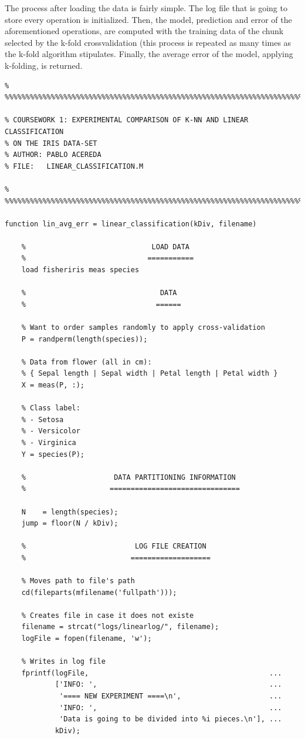 \documentclass[11pt]{article}
\begin{document}
The process after loading the data is fairly simple. The log file that is going
to store every operation is initialized. Then, the model, prediction and error
of the aforementioned operations, are computed with the training data of the
chunk selected by the k-fold crossvalidation (this process is repeated as many
times as the k-fold algorithm stipulates. Finally, the average error of the
model, applying k-folding, is returned.

\begin{verbatim}
% %%%%%%%%%%%%%%%%%%%%%%%%%%%%%%%%%%%%%%%%%%%%%%%%%%%%%%%%%%%%%%%%%%%%%%%%%

% COURSEWORK 1: EXPERIMENTAL COMPARISON OF K-NN AND LINEAR CLASSIFICATION
% ON THE IRIS DATA-SET
% AUTHOR: PABLO ACEREDA
% FILE:   LINEAR_CLASSIFICATION.M

% %%%%%%%%%%%%%%%%%%%%%%%%%%%%%%%%%%%%%%%%%%%%%%%%%%%%%%%%%%%%%%%%%%%%%%%%%

function lin_avg_err = linear_classification(kDiv, filename)

    %                              LOAD DATA
    %                             ===========
    load fisheriris meas species

    %                                DATA 
    %                               ======

    % Want to order samples randomly to apply cross-validation
    P = randperm(length(species));

    % Data from flower (all in cm):
    % { Sepal length | Sepal width | Petal length | Petal width }
    X = meas(P, :);

    % Class label:
    % - Setosa
    % - Versicolor
    % - Virginica
    Y = species(P);

    %                     DATA PARTITIONING INFORMATION
    %                    ===============================

    N    = length(species);
    jump = floor(N / kDiv);

    %                          LOG FILE CREATION
    %                         ===================

    % Moves path to file's path
    cd(fileparts(mfilename('fullpath')));

    % Creates file in case it does not existe
    filename = strcat("logs/linearlog/", filename);
    logFile = fopen(filename, 'w');

    % Writes in log file
    fprintf(logFile,                                           ...
            ['INFO: ',                                         ...
             '==== NEW EXPERIMENT ====\n',                     ...
             'INFO: ',                                         ...
             'Data is going to be divided into %i pieces.\n'], ...
            kDiv);


\end{verbatim}
\end{document}
